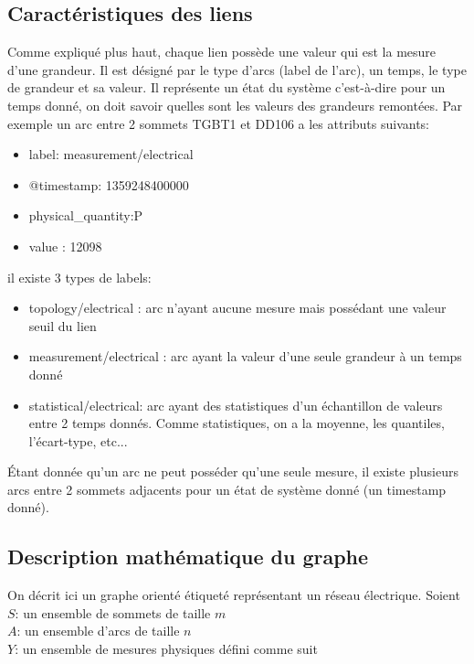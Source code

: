\documentclass[onecolumn, 12pt]{article}
\begin{document}
\subsection{Caract\'eristiques des liens}
Comme expliqu\'e plus haut, chaque lien poss\`ede une valeur qui est la mesure d'une grandeur. Il est d\'esign\'e par le type d'arcs (label de l'arc), un temps, le type de grandeur et sa valeur. Il repr\'esente un \'etat du syst\`eme c'est-\`a-dire pour un temps donn\'e, on doit savoir quelles sont les valeurs des grandeurs remont\'ees. Par exemple un arc entre 2 sommets TGBT1 et DD106 a les attributs suivants:
\begin{itemize}
\item label: measurement/electrical
\item @timestamp: 1359248400000
\item physical\_quantity:P
\item value : 12098
\end{itemize}
il existe 3 types de labels: 
\begin{itemize}
\item topology/electrical : arc n'ayant aucune mesure mais poss\'edant une valeur seuil du lien
\item measurement/electrical : arc ayant la valeur d'une seule grandeur \`a un temps donn\'e
\item statistical/electrical: arc ayant des statistiques d'un \'echantillon de valeurs entre 2 temps donn\'es. Comme statistiques, on a la moyenne, les quantiles, l'\'ecart-type, etc...   
\end{itemize} 
\'Etant donn\'ee qu'un arc ne peut poss\'eder qu'une seule mesure, il existe plusieurs arcs entre 2 sommets adjacents pour un \'etat de syst\`eme donn\'e (un timestamp donn\'e).  

\subsection{Description math\'ematique du graphe} 

On d\'ecrit ici un graphe orient\'e \'etiquet\'e repr\'esentant un r\'eseau \'electrique.
Soient\\
 $S$: un ensemble de sommets de taille $m$ \\
$A$: un ensemble d'arcs de taille $n$ \\
$Y$: un ensemble de mesures physiques d\'efini comme suit
\end{document}
